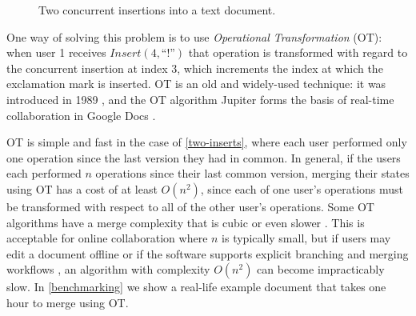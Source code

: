 \documentclass[sigplan,10pt]{acmart}
\begin{document}
\begin{figure}
  \centering
  \caption{Two concurrent insertions into a text document.}
  \label{two-inserts}
\end{figure}

One way of solving this problem is to use \emph{Operational Transformation} (OT): when user 1 receives $\mathit{Insert}(4, \text{``!''})$ that operation is transformed with regard to the concurrent insertion at index 3, which increments the index at which the exclamation mark is inserted.
OT is an old and widely-used technique: it was introduced in 1989 \cite{Ellis1989}, and the OT algorithm Jupiter \cite{Nichols1995} forms the basis of real-time collaboration in Google Docs \cite{DayRichter2010}.

OT is simple and fast in the case of \autoref{two-inserts}, where each user performed only one operation since the last version they had in common.
In general, if the users each performed $n$ operations since their last common version, merging their states using OT has a cost of at least $O(n^2)$, since each of one user's operations must be transformed with respect to all of the other user's operations.
Some OT algorithms have a merge complexity that is cubic or even slower \cite{Li2006,Roh2011RGA,Sun2020OT}.
This is acceptable for online collaboration where $n$ is typically small, but if users may edit a document offline or if the software supports explicit branching and merging workflows \cite{Upwelling}, an algorithm with complexity $O(n^2)$ can become impracticably slow.
In \autoref{benchmarking} we show a real-life example document that takes one hour to merge using OT.
\end{document}
